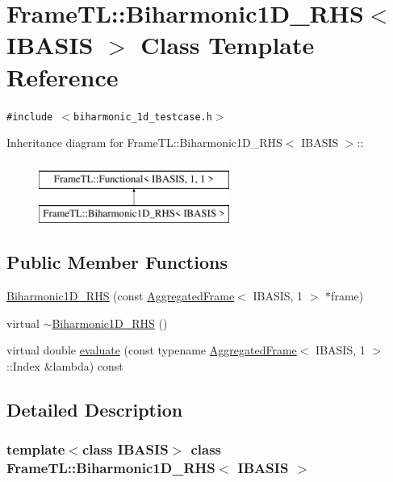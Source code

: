 \hypertarget{classFrameTL_1_1Biharmonic1D__RHS}{
\section{FrameTL::Biharmonic1D\_\-RHS$<$ IBASIS $>$ Class Template Reference}
\label{classFrameTL_1_1Biharmonic1D__RHS}
}
{\tt \#include $<$biharmonic\_\-1d\_\-testcase.h$>$}

Inheritance diagram for FrameTL::Biharmonic1D\_\-RHS$<$ IBASIS $>$::\begin{figure}[H]
\begin{center}
\leavevmode
\includegraphics[height=2cm]{classFrameTL_1_1Biharmonic1D__RHS}
\end{center}
\end{figure}
\subsection*{Public Member Functions}
\begin{CompactItemize}
\item 
\hyperlink{classFrameTL_1_1Biharmonic1D__RHS_c9600ba95f7c01ef6080a4372e0d3031}{Biharmonic1D\_\-RHS} (const \hyperlink{classFrameTL_1_1AggregatedFrame}{AggregatedFrame}$<$ IBASIS, 1 $>$ $\ast$frame)
\item 
virtual \hyperlink{classFrameTL_1_1Biharmonic1D__RHS_4b3957bc2e77d88486b21916c7a74030}{$\sim$Biharmonic1D\_\-RHS} ()
\item 
virtual double \hyperlink{classFrameTL_1_1Biharmonic1D__RHS_81cf28300f5a4991eea662f403b5ae88}{evaluate} (const typename \hyperlink{classFrameTL_1_1AggregatedFrame}{AggregatedFrame}$<$ IBASIS, 1 $>$::Index \&lambda) const 
\end{CompactItemize}


\subsection{Detailed Description}
\subsubsection*{template$<$class IBASIS$>$ class FrameTL::Biharmonic1D\_\-RHS$<$ IBASIS $>$}

